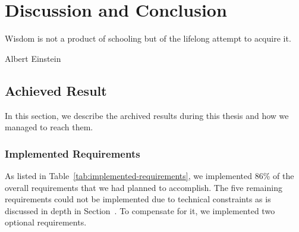 \chapter{Discussion and Conclusion}
\epigraph{Wisdom is not a product of schooling but of the lifelong attempt to acquire it.}{Albert Einstein}
\section{Achieved Result}

In this section, we describe the archived results during this thesis and how we managed to reach them.

\subsection{Implemented Requirements}

As listed in Table~\ref{tab:implemented-requirements}, we implemented 86\% of the overall requirements that we had planned to accomplish. The five remaining requirements could not be implemented due to technical constraints as is discussed in depth in Section~. To compensate for it, we implemented two optional requirements.

